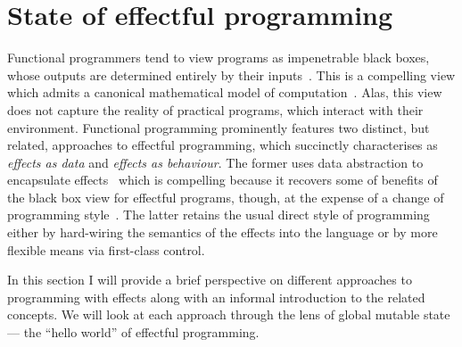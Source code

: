 \documentclass[12pt,phd,lfcs,twoside,openright,logo,leftchapter,normalheadings]{infthesis}
\theoremstyle{plain}
\theoremstyle{definition}
\begin{document}
\section{State of effectful programming}
\label{sec:state-of-effprog}

Functional programmers tend to view programs as impenetrable black
boxes, whose outputs are determined entirely by their
inputs~\cite{Hughes89,Howard80}. This is a compelling view which
admits a canonical mathematical model of
computation~\cite{Church32,Church41}. Alas, this view does not capture
the reality of practical programs, which interact with their
environment.
%
Functional programming prominently features two distinct, but related,
approaches to effectful programming, which \citet{Filinski96}
succinctly characterises as \emph{effects as data} and \emph{effects
  as behaviour}.
%
The former uses data abstraction to encapsulate
effects~\cite{Moggi91,Wadler92} which is compelling because it
recovers some of benefits of the black box view for effectful
programs, though, at the expense of a change of programming
style~\cite{JonesW93}. The latter retains the usual direct style of
programming either by hard-wiring the semantics of the effects into
the language or by more flexible means via first-class control.

In this section I will provide a brief perspective on different
approaches to programming with effects along with an informal
introduction to the related concepts. We will look at each approach
through the lens of global mutable state --- the ``hello world'' of
effectful programming.


\end{document}

